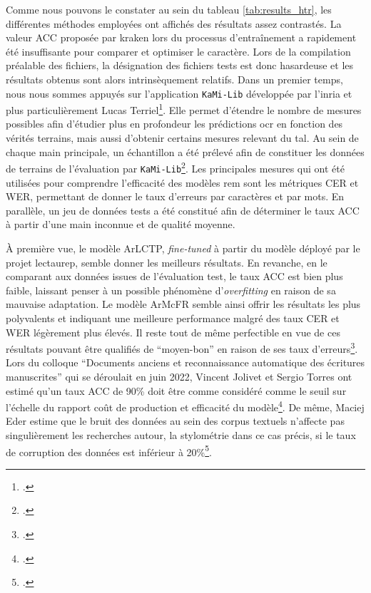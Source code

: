     Comme nous pouvons le constater au sein du tableau \ref{tab:results_htr}, les différentes méthodes employées ont affichés des résultats assez contrastés. La valeur \gls{ACC} proposée par kraken lors du processus d'entraînement a rapidement été insuffisante pour comparer et optimiser le caractère. Lors de la compilation préalable des fichiers, la désignation des fichiers tests est donc hasardeuse et les résultats obtenus sont alors intrinsèquement relatifs. Dans un premier temps, nous nous sommes appuyés sur l'application \texttt{KaMi-Lib} développée par l'\gls{inria} et plus particulièrement Lucas Terriel\footcite{terrielKaMIlib2022}. Elle permet d'étendre le nombre de mesures possibles afin d'étudier plus en profondeur les prédictions \gls{ocr} en fonction des vérités terrains, mais aussi d'obtenir certains mesures relevant du \gls{tal}. Au sein de chaque main principale, un échantillon a été prélevé afin de constituer les données de terrains de l'évaluation par \texttt{KaMi-Lib}\footcite{humeauHTREvaluation2022}. Les principales mesures qui ont été utilisées pour comprendre l'efficacité des modèles \gls{rem} sont les métriques \gls{CER} et \gls{WER}, permettant de donner le taux d'erreurs par caractères et par mots. En parallèle, un jeu de données tests a été constitué afin de déterminer le taux \gls{ACC} à partir d'une main inconnue et de qualité moyenne. 
    
    À première vue, le modèle ArLCTP, \textit{fine-tuned} à partir du modèle déployé par le projet \gls{lectaurep}, semble donner les meilleurs résultats. En revanche, en le comparant aux données issues de l'évaluation test, le taux \gls{ACC} est bien plus faible, laissant penser à un possible phénomène d'\textit{overfitting} en raison de sa mauvaise adaptation. Le modèle ArMcFR semble ainsi offrir les résultats les plus polyvalents et indiquant une meilleure performance malgré des taux \gls{CER} et \gls{WER} légèrement plus élevés. Il reste tout de même perfectible en vue de ces résultats pouvant être qualifiés de \enquote{moyen-bon} en raison de ses taux d'erreurs\footcite[Dans cette article, il est estimé que le \gls{CER} doit être inférieur à 2 afin d'être qualifié de très bon voir d'excellent]{tomoiagaFieldTypingImproved2019}. Lors du colloque \enquote{Documents anciens et reconnaissance automatique des écritures manuscrites} qui se déroulait en juin 2022, Vincent Jolivet et Sergio Torres ont estimé qu'un taux \gls{ACC} de 90\% doit être comme considéré comme le seuil sur l'échelle du rapport coût de production et efficacité du modèle\footcite{torresHTRFineTuning2022}. De même, Maciej Eder estime que le bruit des données au sein des corpus textuels n'affecte pas singulièrement les recherches autour, la stylométrie dans ce cas précis, si le taux de corruption des données est inférieur à 20\%\footcite{ederMindYourCorpus2013}.
    
